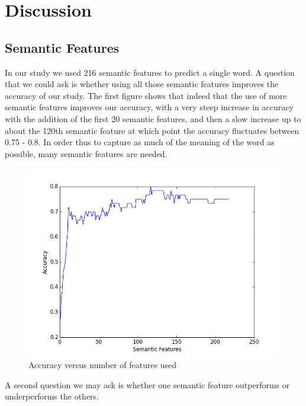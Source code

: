 \documentclass{article} %
\begin{document}
\section{Discussion}


\subsection{Semantic Features}

In our study we used 216 semantic features to predict a single word. A question that we could ask is whether using all those semantic features improves the accuracy of our study. The first figure shows that indeed that the use of more semantic features improves our accuracy, with a very steep increase in accuracy with the addition of the first 20 semantic features, and then a slow increase up to about the 120th semantic feature at which point the accuracy fluctuates between 0.75  - 0.8. In order thus to capture as much of the meaning of the word as possible, many semantic features are needed.

\begin{figure}[h]
\begin{center}
\includegraphics[scale=0.5]{accuracyVSnumFeatures.png}
\end{center}
\caption{Accuracy versus number of features used}
\end{figure}

A second question we may ask is whether one semantic feature outperforms or underperforms the others.
\end{document}
